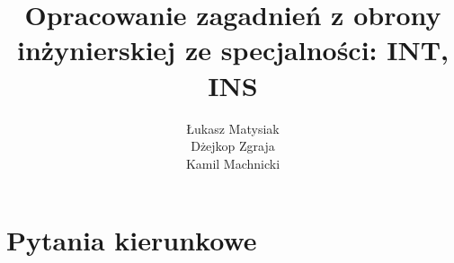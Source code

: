 \documentclass[11pt,a4paper]{article}
\title{Opracowanie zagadnień z obrony inżynierskiej ze specjalności: INT, INS}
\author{Łukasz Matysiak\\Dżejkop Zgraja\\Kamil Machnicki}
\makeatletter
\newcommand{\University}{Politechnika Wrocławska}
\newcommand{\Department}{Wydział Elektroniki}
\newcommand{\Faculty}{Informatyka}
\renewcommand{\maketitle}{
\begin{titlepage}
    \begin{center}
        \huge\textsc{{\University}}\\
        \Large\textsc{{\Department}}\\
        \Large\textsc{{\Faculty}}\par
        
        \vspace{5cm}
        \huge\textbf{\@title}\par
        
        \vspace{6cm}
        \large\textit{Autorzy:}\\ 
        \Large\textbf{\@author}\par 
        
        \vspace{4.5cm}
        \small Wrocław \\
        \small \@date \\
    \end{center}
\end{titlepage}
}
\makeatother
\begin{document}
\tableofcontents
\part{Pytania kierunkowe}



\end{document}

